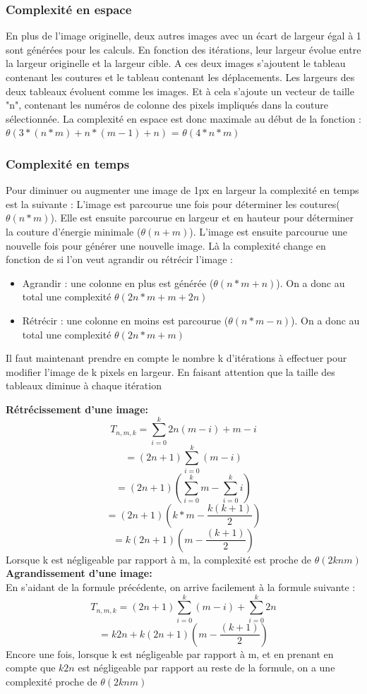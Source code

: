 \documentclass[10pt]{article}
\begin{document}
\subsubsection{Complexité en espace}
	En plus de l'image originelle, deux autres images avec un écart de largeur égal à 1 sont générées pour les calculs. En fonction des itérations, leur largeur évolue entre la largeur originelle et la largeur cible. A ces deux images s'ajoutent le tableau contenant les coutures et le tableau contenant les déplacements. Les largeurs des deux tableaux évoluent comme les images. Et à cela s'ajoute un vecteur de taille "n", contenant les numéros de colonne des pixels impliqués dans la couture sélectionnée.
	La complexité en espace est donc maximale au début de la fonction : $\theta(3*(n*m) + n*(m-1) + n)$ = $\theta(4*n*m)$
\subsubsection{Complexité en temps}
	Pour diminuer ou augmenter une image de 1px en largeur la complexité en temps est la suivante :
L'image est parcourue une fois pour déterminer les coutures($\theta(n*m)$). Elle est ensuite parcourue en largeur et en hauteur pour déterminer la couture d'énergie minimale ($\theta(n+m)$). L'image est ensuite parcourue une nouvelle fois pour générer une nouvelle image. Là la complexité change en fonction de si l'on veut agrandir ou rétrécir l'image :
\begin{itemize}
 \item Agrandir : une colonne en plus est générée ($\theta(n*m + n)$). On a donc au total une complexité $\theta(2n*m + m + 2n)$
 \item Rétrécir : une colonne en moins est parcourue ($\theta(n*m - n)$). On a donc au total une complexité $\theta(2n*m + m)$
 \end{itemize}
 Il faut maintenant prendre en compte le nombre k d'itérations à effectuer pour modifier l'image de k pixels en largeur. En faisant attention que la taille des tableaux diminue à chaque itération
 
\textbf{Rétrécissement d'une image:}
$$
 	T_{n,m,k} = \sum\limits_{i=0}^{k} 2n(m-i) + m-i 
$$
$$
 	= (2n + 1)\sum\limits_{i=0}^{k} (m -i)
$$
$$
 	= (2n + 1)(\sum\limits_{i=0}^{k} m - \sum\limits_{i=0}^{k} i)
$$
$$
 	= (2n + 1)(k*m - \frac{k(k+1)}{2})
$$
$$
 	= k(2n + 1)(m - \frac{(k+1)}{2})
$$
Lorsque k est négligeable par rapport à m, la complexité est proche de $\theta(2knm)$\\
\textbf{Agrandissement d'une image:} \\
En s'aidant de la formule précédente, on arrive facilement à la formule suivante :
$$
 	T_{n,m,k} = (2n + 1)\sum\limits_{i=0}^{k} (m -i) + \sum\limits_{i=0}^{k} 2n
$$
$$
 	= k2n + k(2n + 1)(m - \frac{(k+1)}{2})
$$
Encore une fois, lorsque k est négligeable par rapport à m, et en prenant en compte que $k2n$ est négligeable par rapport au reste de la formule, on a une complexité proche de $\theta(2knm)$ 
 
\end{document}
